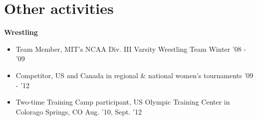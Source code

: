 \documentclass[margin]{res}
\begin{document}
\begin{resume}
\begin{itemize}[leftmargin=*]
\end{itemize}

\section{Other activities}
{\bf Wrestling}
\begin{itemize}[leftmargin=*] \itemsep -2pt
\item Team Member, MIT's NCAA Div. III Varsity Wrestling Team \hfill Winter '08 - '09
\item Competitor, US and Canada in regional \& national women's tournaments \hfill '09 - '12
\item Two-time Training Camp participant, US Olympic Training Center in Colorago Springs, CO \hfill Aug. '10, Sept. '12


\end{itemize}

\end{resume} 
 
\end{document}
